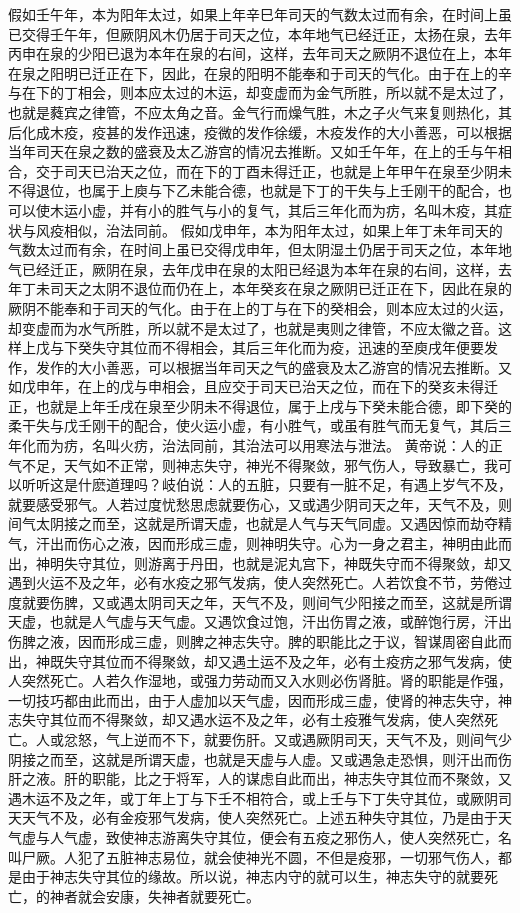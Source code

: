 \documentclass[a4paper,12pt,UTF8,twoside]{ctexbook}
\begin{document}
假如壬午年，本为阳年太过，如果上年辛巳年司天的气数太过而有余，在时间上虽已交得壬午年，但厥阴风木仍居于司天之位，本年地气已经迁正，太扬在泉，去年丙申在泉的少阳已退为本年在泉的右间，这样，去年司天之厥阴不退位在上，本年在泉之阳明已迁正在下，因此，在泉的阳明不能奉和于司天的气化。由于在上的辛与在下的丁相会，则本应太过的木运，却变虚而为金气所胜，所以就不是太过了，也就是蕤宾之律管，不应太角之音。金气行而燥气胜，木之子火气来复则热化，其后化成木疫，疫甚的发作迅速，疫微的发作徐缓，木疫发作的大小善恶，可以根据当年司天在泉之数的盛衰及太乙游宫的情况去推断。又如壬午年，在上的壬与午相合，交于司天已治天之位，而在下的丁酉未得迁正，也就是上年甲午在泉至少阴未不得退位，也属于上庾与下乙未能合德，也就是下丁的干失与上壬刚干的配合，也可以使木运小虚，并有小的胜气与小的复气，其后三年化而为疠，名叫木疫，其症状与风疫相似，治法同前。
假如戊申年，本为阳年太过，如果上年丁未年司天的气数太过而有余，在时间上虽已交得戊申年，但太阴湿土仍居于司天之位，本年地气已经迁正，厥阴在泉，去年戊申在泉的太阳已经退为本年在泉的右间，这样，去年丁未司天之太阴不退位而仍在上，本年癸亥在泉之厥阴已迁正在下，因此在泉的厥阴不能奉和于司天的气化。由于在上的丁与在下的癸相会，则本应太过的火运，却变虚而为水气所胜，所以就不是太过了，也就是夷则之律管，不应太徽之音。这样上戊与下癸失守其位而不得相会，其后三年化而为疫，迅速的至庾戌年便要发作，发作的大小善恶，可以根据当年司天之气的盛衰及太乙游宫的情况去推断。又如戊申年，在上的戊与申相会，且应交于司天已治天之位，而在下的癸亥未得迁正，也就是上年壬戌在泉至少阴未不得退位，属于上戌与下癸未能合德，即下癸的柔干失与戊壬刚干的配合，使火运小虚，有小胜气，或虽有胜气而无复气，其后三年化而为疠，名叫火疠，治法同前，其治法可以用寒法与泄法。
黄帝说：人的正气不足，天气如不正常，则神志失守，神光不得聚敛，邪气伤人，导致暴亡，我可以听听这是什麽道理吗？岐伯说：人的五脏，只要有一脏不足，有遇上岁气不及，就要感受邪气。人若过度忧愁思虑就要伤心，又或遇少阴司天之年，天气不及，则间气太阴接之而至，这就是所谓天虚，也就是人气与天气同虚。又遇因惊而劫夺精气，汗出而伤心之液，因而形成三虚，则神明失守。心为一身之君主，神明由此而出，神明失守其位，则游离于丹田，也就是泥丸宫下，神既失守而不得聚敛，却又遇到火运不及之年，必有水疫之邪气发病，使人突然死亡。人若饮食不节，劳倦过度就要伤脾，又或遇太阴司天之年，天气不及，则间气少阳接之而至，这就是所谓天虚，也就是人气虚与天气虚。又遇饮食过饱，汗出伤胃之液，或醉饱行房，汗出伤脾之液，因而形成三虚，则脾之神志失守。脾的职能比之于议，智谋周密自此而出，神既失守其位而不得聚敛，却又遇土运不及之年，必有土疫疠之邪气发病，使人突然死亡。人若久作湿地，或强力劳动而又入水则必伤肾脏。肾的职能是作强，一切技巧都由此而出，由于人虚加以天气虚，因而形成三虚，使肾的神志失守，神志失守其位而不得聚敛，却又遇水运不及之年，必有土疫雅气发病，使人突然死亡。人或忿怒，气上逆而不下，就要伤肝。又或遇厥阴司天，天气不及，则间气少阴接之而至，这就是所谓天虚，也就是天虚与人虚。又或遇急走恐惧，则汗出而伤肝之液。肝的职能，比之于将军，人的谋虑自此而出，神志失守其位而不聚敛，又遇木运不及之年，或丁年上丁与下壬不相符合，或上壬与下丁失守其位，或厥阴司天天气不及，必有金疫邪气发病，使人突然死亡。上述五种失守其位，乃是由于天气虚与人气虚，致使神志游离失守其位，便会有五疫之邪伤人，使人突然死亡，名叫尸厥。人犯了五脏神志易位，就会使神光不圆，不但是疫邪，一切邪气伤人，都是由于神志失守其位的缘故。所以说，神志内守的就可以生，神志失守的就要死亡，的神者就会安康，失神者就要死亡。
\end{document}
